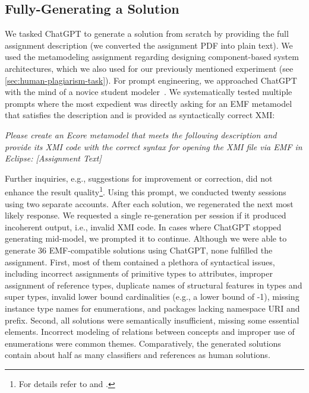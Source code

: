 \subsection{Fully-Generating a Solution}

\label{subsec:chatgpt-full}
We tasked ChatGPT to generate a solution from scratch by providing the full assignment description (we converted the assignment PDF into plain text).
We used the metamodeling assignment regarding designing component-based system architectures, which we also used for our previously mentioned experiment (see \autoref{sec:human-plagiarism-task}).
For prompt engineering, we approached ChatGPT with the mind of a novice student modeler~\cite{Saglam2023}.
We systematically tested multiple prompts where the most expedient was directly asking for an \ac{EMF} metamodel that satisfies the description and is provided as syntactically correct XMI:
\begin{myquote}
    \textit{Please create an Ecore metamodel that meets the following description and provide its \ac{XMI} code with the correct syntax for opening the \ac{XMI} file via \ac{EMF} in Eclipse: [Assignment Text]}
\end{myquote}
Further inquiries, e.g., suggestions for improvement or correction, did not enhance the result quality\footnote{For details refer to \cite{Saglam2023} and \cite{Saglam2023_supp}.}.
Using this prompt, we conducted twenty sessions using two separate accounts. After each solution, we regenerated the next most likely response. We requested a single re-generation per session if it produced incoherent output, i.e., invalid \ac{XMI} code. 
In cases where ChatGPT stopped generating mid-model, we prompted it to continue.
%
Although we were able to generate 36 EMF-compatible solutions using ChatGPT, none fulfilled the assignment.
First, most of them contained a plethora of syntactical issues, including incorrect assignments of primitive types to attributes, improper assignment of reference types, duplicate names of structural features in types and super types, invalid lower bound cardinalities (e.g., a lower bound of -1), missing instance type names for enumerations, and packages lacking namespace \ac{URI} and prefix.
%
Second, all solutions were semantically insufficient, missing some essential elements. Incorrect modeling of relations between concepts and improper use of enumerations were common themes. Comparatively, the generated solutions contain about half as many classifiers and references as human solutions.

